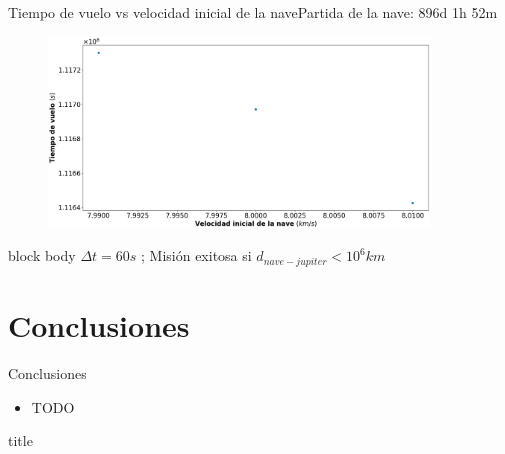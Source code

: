 \documentclass{beamer}
\begin{document}
            \begin{frame}{Tiempo de vuelo vs velocidad inicial de la nave}{Partida de la nave: 896d 1h 52m}
                \begin{figure}[H!]
                    \includegraphics[width=0.9\textwidth]{./travel_time_vs_v0_logarithmic_jupiter}
                    \label{fig:jupiter_7}
                \end{figure}
                \begin{beamercolorbox}[sep=5pt,center]{block body}
                    \centering
                    \small{$\Delta t = 60s$ ; Misión exitosa si $d_{nave-jupiter} < 10^6 km$}
                \end{beamercolorbox}
            \end{frame}

    \section{Conclusiones}

        \begin{frame}{Conclusiones}
            \begin{itemize}
                \item TODO
            \end{itemize}
        \end{frame}

        \begin{frame}
            \begin{beamercolorbox}[sep=8pt,center]{title}
            \end{beamercolorbox}
        \end{frame}
\end{document}
